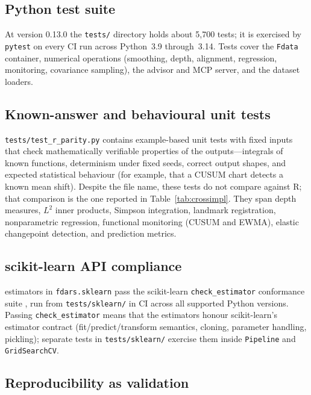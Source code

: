 \subsection{Python test suite}

At version 0.13.0 the \texttt{tests/} directory holds about 5{,}700 tests; it is exercised by \texttt{pytest}
on every CI run across Python~3.9 through~3.14.
Tests cover the \texttt{Fdata} container, numerical operations (smoothing,
depth, alignment, regression, monitoring, covariance sampling), the advisor
and MCP server, and the dataset loaders.

\subsection{Known-answer and behavioural unit tests}

\texttt{tests/test\_r\_parity.py} contains example-based unit tests with
fixed inputs that check mathematically verifiable properties of the outputs---integrals of known functions, determinism under fixed seeds,
correct output shapes, and expected statistical behaviour (for example, that a
CUSUM chart detects a known mean shift).  Despite the file name, these tests do
not compare against R; that comparison is the one reported in
Table~\ref{tab:crossimpl}.  They span depth measures, $L^2$ inner products,
Simpson integration, landmark registration, nonparametric regression,
functional monitoring (CUSUM and EWMA), elastic changepoint detection, and
prediction metrics.

\subsection{scikit-learn API compliance}

\nsklearnestimators{} estimators in \texttt{fdars.sklearn} pass the
scikit-learn \texttt{check\_estimator} conformance suite
\citep{pedregosa_sklearn_2011}, run from \texttt{tests/sklearn/} in CI across
all supported Python versions.
Passing \texttt{check\_estimator} means that the estimators honour
scikit-learn's estimator contract (fit/predict/transform semantics, cloning,
parameter handling, pickling); separate tests in \texttt{tests/sklearn/}
exercise them inside \texttt{Pipeline} and \texttt{GridSearchCV}.

\subsection{Reproducibility as validation}

